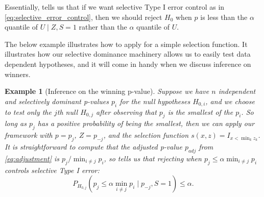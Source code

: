 \documentclass{article}
\newtheorem{example}{Example}
\begin{document}
Essentially,  tells us that if we want selective Type I error control as in \eqref{eq:selective_error_control}, then we should reject $H_0$ when $p$ is less than the $\alpha$ quantile of $U \mid Z, S = 1$ rather than the $\alpha$ quantile of $U$. 

The below example illustrates how to apply  for a simple selection function. It illustrates how our selective dominance machinery allows us to easily test data dependent hypotheses, and it will come in handy when we discuss inference on winners. 


\begin{example}[Inference on the winning p-value]
    \label{exm:winner} Suppose we have $n$ independent and selectively dominant p-values $p_i$ for the null hypotheses $H_{0, i}$, and we choose to test only the $j$th null $H_{0, j}$ after observing that $p_j$ is the smallest of the $p_i$. So long as $p_j$ has a positive probability of being the smallest, then we can apply our framework with $p =p_j$, $Z = p_{-j}$, and the selection function $s(x, z) = I_{x < \min_{k} z_k}$. It is straightforward to compute that the adjusted p-value $p_{adj}$ from \eqref{eq:adjustment} is $p_j/\min_{i \neq j} p_i$, so  tells us that rejecting when $p_j \leq \alpha \min_{i \neq j} p_i$ controls selective Type I error:
    \begin{equation}
        \label{eq:winner_error_control}
        P_{H_{0, j}}(p_j \leq \alpha \min_{i \neq j} p_i \mid  p_{-j}, S = 1) \leq \alpha.
    \end{equation} 


\end{example}
\end{document}

